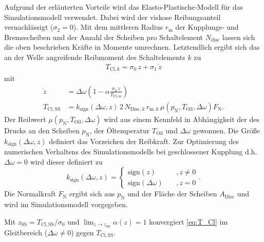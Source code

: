 Aufgrund der erläuterten Vorteile wird das Elasto-Plastische-Modell für das Simulationsmodell verwendet. Dabei wird der viskose Reibungsanteil vernachlässigt ($\sigma_2 = 0$). Mit dem mittleren Radius $r_\mathrm{m}$ der Kupplungs- und Bremsscheiben und der Anzahl der Scheiben pro Schaltelement $N_\mathrm{disc}$  lassen sich die oben beschrieben Kräfte in Momente umrechnen. Letztendlich ergibt sich das an der Welle angreifende Reibmoment des Schaltelements $k$ zu
\begin{align}\label{eq:T_Cl}
T_{\mathrm{Cl},k} = \sigma_0\,z + \sigma_1\,\dot{z}
\end{align}
mit
\begin{align}
\dot{z} &= \Delta \omega \left(1-\alpha\frac{\sigma_0\,z}{T_\mathrm{Cl,ss}}\right)\\
T_\mathrm{Cl,SS} &= k_\mathrm{sign}(\Delta \omega,z)\,2\,N_{\mathrm{Disc},k}\,r_{\mathrm{m},k}\,\mu(p_\mathrm{N},T_\mathrm{Oil},\Delta \omega)F_\mathrm{N}.\label{eq:T_ClSS}
\end{align}
Der Reibwert $\mu(p_\mathrm{N},T_\mathrm{Oil},\Delta \omega)$ wird aus einem Kennfeld in Abhängigkeit der des Drucks an den Scheiben $p_\mathrm{N}$, der Öltemperatur $T_\mathrm{Oil}$ und $\Delta \omega$ gewonnen. Die Größe $k_\mathrm{sign}(\Delta \omega,z)$ definiert das Vorzeichen der Reibkraft. Zur Optimierung des numerischen Verhaltens des Simulationsmodells bei geschlossener Kupplung d.h. $\Delta \omega = 0$ wird dieser definiert zu 
\begin{equation}
k_\mathrm{sign}(\Delta \omega,z)=\begin{cases} \mathrm{sign}(z)\quad &,z\neq 0\\\mathrm{sign}(\Delta \omega)\quad &,z = 0\end{cases}.
\end{equation}
Die Normalkraft $F_\mathrm{N}$ ergibt sich aus $p_\mathrm{N}$ und der Fläche der Scheiben $A_\mathrm{Disc}$ und wird im Simulationsmodell vorgegeben. 

Mit $z_\mathrm{SS} = T_\mathrm{Cl,SS}/\sigma_0$ und $\lim_{z \rightarrow z_\mathrm{SS}}\alpha(z)=1$ konvergiert \eqref{eq:T_Cl} im Gleitbereich ($\Delta \omega \neq 0$) gegen $T_\mathrm{Cl,SS}$. 

